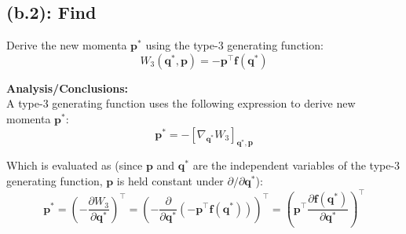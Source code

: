 \documentclass[titlepage]{article}
\begin{document}
\subsection*{(b.2): Find}

Derive the new momenta $\boldsymbol{p}^*$ using the type-3 generating function:
\begin{equation}
	W_3(\boldsymbol{q}^*,\boldsymbol{p})=-\boldsymbol{p}^\top\boldsymbol{f}(\boldsymbol{q}^*)
\end{equation}

\textbf{Analysis/Conclusions:} \\

A type-3 generating function uses the following expression to derive new momenta $\boldsymbol{p}^*$:
\begin{equation}
	\boldsymbol{p}^*=-\left[\nabla_{\boldsymbol{q}^*}W_3\right]_{\boldsymbol{q}^*,\boldsymbol{p}}
\end{equation}

Which is evaluated as (since $\boldsymbol{p}$ and $\boldsymbol{q}^*$ are the independent variables of the type-3 generating function, $\boldsymbol{p}$ is held constant under $\partial/\partial\boldsymbol{q}^*$):
\begin{equation}
	\boldsymbol{p}^*=\left(-\frac{\partial W_3}{\partial\boldsymbol{q}^*}\right)^\top=\left(-\frac{\partial}{\partial\boldsymbol{q}^*}\left(-\boldsymbol{p}^\top\boldsymbol{f}(\boldsymbol{q}^*)\right)\right)^\top=\left(\boldsymbol{p}^\top\frac{\partial\boldsymbol{f}(\boldsymbol{q}^*)}{\partial\boldsymbol{q}^*}\right)^\top
	\label{eq:prelationship}
\end{equation}
\end{document}
